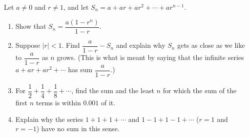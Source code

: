Let $a\ne0$ and $r\ne1$, and let $S_n=a+ar+ar^2+\cdots+ar^{n-1}$.
\begin{enumerate}
\item[(a)] Show that $S_n=\dfrac{a(1-r^n)}{1-r}$.
\item[(b)] Suppose $|r|<1$. Find $\dfrac{a}{1-r}-S_n$ and explain why $S_n$ gets as close as we like to $\dfrac{a}{1-r}$ as $n$ grows. (This is what is meant by saying that the infinite series $a+ar+ar^2+\cdots$ has sum $\dfrac{a}{1-r}$.)
\item[(c)] For $\dfrac{1}{2}+\dfrac{1}{4}+\dfrac{1}{8}+\cdots$, find the sum and the least $n$ for which the sum of the first $n$ terms is within $0.001$ of it.
\item[(d)] Explain why the series $1+1+1+\cdots$ and $1-1+1-1+\cdots$ ($r=1$ and $r=-1$) have no sum in this sense.
\end{enumerate}
